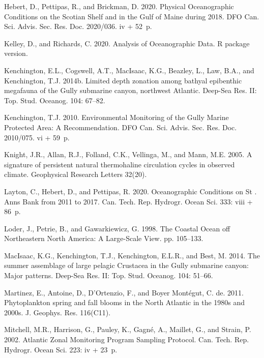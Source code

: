 \documentclass[12pt]{article}\usepackage[]{graphicx}\usepackage[]{color}
\begin{document}
\begin{CSLReferences}{1}{0}
%
Hebert, D., Pettipas, R., and Brickman, D. 2020. {Physical Oceanographic Conditions on the Scotian Shelf and in the Gulf of Maine during 2018}. DFO Can. Sci. Advis. Sec. Res. Doc. 2020/036. iv + 52~p.

%
Kelley, D., and Richards, C. 2020. {Analysis of Oceanographic Data. R package version}.

%
Kenchington, E.L., Cogswell, A.T., MacIsaac, K.G., Beazley, L., Law, B.A., and Kenchington, T.J. 2014b. {Limited depth zonation among bathyal epibenthic megafauna of the Gully submarine canyon, northwest Atlantic}. Deep-Sea Res. II: Top. Stud. Oceanog. 104: 67--82.

%
Kenchington, T.J. 2010. {Environmental Monitoring of the Gully Marine Protected Area: A Recommendation.} DFO Can. Sci. Advis. Sec. Res. Doc. 2010/075. vi + 59~p.

%
Knight, J.R., Allan, R.J., Folland, C.K., Vellinga, M., and Mann, M.E. 2005. {A signature of persistent natural thermohaline circulation cycles in observed climate}. Geophysical Research Letters 32(20).

%
Layton, C., Hebert, D., and Pettipas, R. 2020. {Oceanographic Conditions on St . Anns Bank from 2011 to 2017}. Can. Tech. Rep. Hydrogr. Ocean Sci. 333: viii + 86~p.

%
Loder, J., Petrie, B., and Gawarkiewicz, G. 1998. {The Coastal Ocean off Northeastern North America: A Large-Scale View}. pp. 105--133.

%
MacIsaac, K.G., Kenchington, T.J., Kenchington, E.L.R., and Best, M. 2014. {The summer assemblage of large pelagic Crustacea in the Gully submarine canyon: Major patterns}. Deep-Sea Res. II: Top. Stud. Oceanog. 104: 51--66.

%
Martinez, E., Antoine, D., D'Ortenzio, F., and Boyer Montégut, C. de. 2011. {Phytoplankton spring and fall blooms in the North Atlantic in the 1980s and 2000s}. J. Geophys. Res. 116(C11).

%
Mitchell, M.R., Harrison, G., Pauley, K., Gagné, A., Maillet, G., and Strain, P. 2002. {Atlantic Zonal Monitoring Program Sampling Protocol}. Can. Tech. Rep. Hydrogr. Ocean Sci. 223: iv + 23~p.


\end{CSLReferences}
\end{document}
